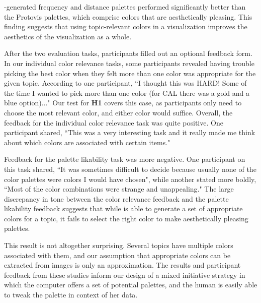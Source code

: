 \system-generated frequency and distance palettes performed significantly better than the Protovis palettes, which comprise colors that are aesthetically pleasing. This finding suggests that using topic-relevant colors in a visualization improves the aesthetics of the visualization as a whole. 

After the two evaluation tasks, participants filled out an optional feedback form. In our individual color relevance tasks, some participants revealed having trouble picking the best color when they felt more than one color was appropriate for the given topic. According to one participant, ``I thought this was HARD! Some of the time I wanted to pick more than one color (for CAL there was a gold and a blue option)..." Our test for \textbf{H1} covers this case, as participants only need to choose the most relevant color, and either color would suffice. Overall, the feedback for the individual color relevance task was quite positive. One participant shared, ``This was a very interesting task and it really made me think about which colors are associated with certain items." 

Feedback for the palette likability task was more negative. One participant on this task shared, ``It was sometimes difficult to decide because usually none of the color palettes were colors I would have chosen", while another stated more boldly, ``Most of the color combinations were strange and unappealing." The large discrepancy in tone between the color relevance feedback and the palette likability feedback suggests that while \system is able to generate a set of appropriate colors for a topic, it fails to select the right color to make aesthetically pleasing palettes. 

This result is not altogether surprising. Several topics have multiple colors associated with them, and our assumption that appropriate colors can be extracted from images is only an approximation. The results and participant feedback from these studies inform our design of a mixed initiative strategy in which the computer offers a set of potential palettes, and the human is easily able to tweak the palette in context of her data.